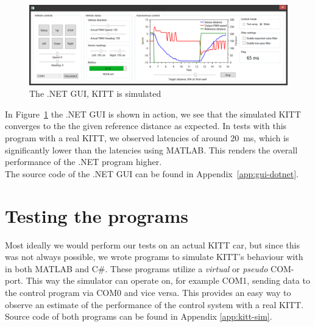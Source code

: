 \documentclass[11pt,titlepage]{report}
\begin{document}
\begin{figure}[H]
	\centering
	\includegraphics[width=\linewidth]{resource/gui-dotnet.png}
	\caption{The .NET GUI, KITT is simulated}
	\label{fig:int-gui-dotnet}
\end{figure}

In Figure~\ref{fig:int-gui-dotnet} the .NET GUI is shown in action, we see that the simulated KITT converges to the the given reference distance as expected. In tests with this program with a real KITT, we observed latencies of around \SI{20}{ms}, which is significantly lower than the latencies using MATLAB. This renders the overall performance of the .NET program higher.
\\
The source code of the .NET GUI can be found in Appendix~\ref{app:gui-dotnet}.

\section{Testing the programs}
Most ideally we would perform our tests on an actual KITT car, but since this was not always possible, we wrote programs to simulate KITT's behaviour with in both MATLAB and C\#. These programs utilize a \textit{virtual} or \textit{pseudo} COM-port. This way the simulator can operate on, for example COM1, sending data to the control program via COM0 and vice versa. This provides an easy way to observe an estimate of the performance of the control system with a real KITT.
\\
Source code of both programs can be found in Appendix \ref{app:kitt-sim}.
\end{document}
